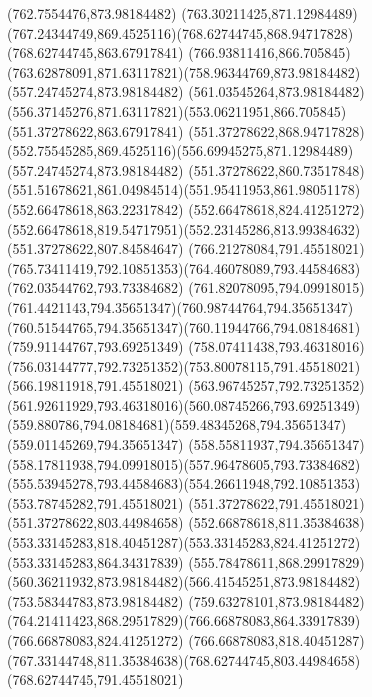 {{	\closepath
	\moveto(762.7554476,873.98184482)
	\curveto(763.30211425,871.12984489)(767.24344749,869.4525116)(768.62744745,868.94717828)
	\lineto(768.62744745,863.67917841)
	\curveto(766.93811416,866.705845)(763.62878091,871.63117821)(758.96344769,873.98184482)
	\closepath
	\moveto(557.24745274,873.98184482)
	\lineto(561.03545264,873.98184482)
	\curveto(556.37145276,871.63117821)(553.06211951,866.705845)(551.37278622,863.67917841)
	\lineto(551.37278622,868.94717828)
	\curveto(552.75545285,869.4525116)(556.69945275,871.12984489)(557.24745274,873.98184482)
	\moveto(551.37278622,860.73517848)
	\curveto(551.51678621,861.04984514)(551.95411953,861.98051178)(552.66478618,863.22317842)
	\lineto(552.66478618,824.41251272)
	\curveto(552.66478618,819.54717951)(552.23145286,813.99384632)(551.37278622,807.84584647)
	\closepath
	\moveto(766.21278084,791.45518021)
	\curveto(765.73411419,792.10851353)(764.46078089,793.44584683)(762.03544762,793.73384682)
	\curveto(761.82078095,794.09918015)(761.4421143,794.35651347)(760.98744764,794.35651347)
	\curveto(760.51544765,794.35651347)(760.11944766,794.08184681)(759.91144767,793.69251349)
	\curveto(758.07411438,793.46318016)(756.03144777,792.73251352)(753.80078115,791.45518021)
	\lineto(566.19811918,791.45518021)
	\curveto(563.96745257,792.73251352)(561.92611929,793.46318016)(560.08745266,793.69251349)
	\curveto(559.880786,794.08184681)(559.48345268,794.35651347)(559.01145269,794.35651347)
	\curveto(558.55811937,794.35651347)(558.17811938,794.09918015)(557.96478605,793.73384682)
	\curveto(555.53945278,793.44584683)(554.26611948,792.10851353)(553.78745282,791.45518021)
	\lineto(551.37278622,791.45518021)
	\lineto(551.37278622,803.44984658)
	\curveto(552.66878618,811.35384638)(553.33145283,818.40451287)(553.33145283,824.41251272)
	\lineto(553.33145283,864.34317839)
	\curveto(555.78478611,868.29917829)(560.36211932,873.98184482)(566.41545251,873.98184482)
	\lineto(753.58344783,873.98184482)
	\curveto(759.63278101,873.98184482)(764.21411423,868.29517829)(766.66878083,864.33917839)
	\lineto(766.66878083,824.41251272)
	\curveto(766.66878083,818.40451287)(767.33144748,811.35384638)(768.62744745,803.44984658)
	\lineto(768.62744745,791.45518021)
	\closepath
}
}
{
}
